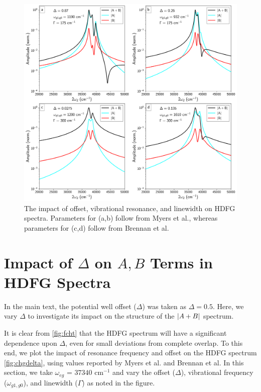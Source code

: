 \documentclass[aip, jcp, reprint, onecolumn, nofootinbib]{revtex4-2}
\begin{document}
\begin{figure}[!htbp]
	\centering
	\includegraphics[width=6.675in]{figures/changedelta.png}
	\caption{The impact of offset, vibrational resonance, and linewidth on HDFG spectra. Parameters for (a,b) follow from Myers et al., whereas parameters for (c,d) follow from Brennan et al.\cite{Myers1982, Brennan2024}} 
	\label{fig:chgdelta}
\end{figure}

\section{Impact of $\Delta$ on $A,B$ Terms in HDFG Spectra}
In the main text, the potential well offset ($\Delta$) was taken as $\Delta = 0.5$.
Here, we vary $\Delta$ to investigate its impact on the structure of the $\abs{A+B}$ spectrum.

It is clear from \autoref{fig:fcht} that the HDFG spectrum will have a significant dependence upon $\Delta$, even for small deviations from complete overlap. 
To this end, we plot the impact of resonance frequency and offset on the HDFG spectrum \autoref{fig:chgdelta}, using values reported by Myers et al. and Brennan et al. \cite{Myers1982, Brennan2024}
In this section, we take $\omega_{eg}$ = $37340$ cm$^{-1}$ and vary the offset ($\Delta$), vibrational frequency ($\omega_{g1,g0}$), and linewidth ($\Gamma$) as noted in the figure.
\end{document}
